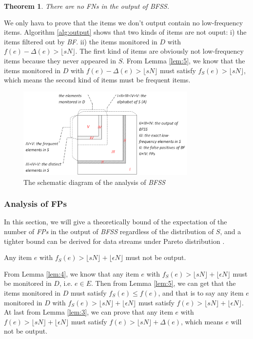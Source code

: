 \documentclass[conference]{IEEEtran}
\begin{document}
\newtheorem{theorem}{Theorem}
\begin{theorem}\label{thm:1}
	There are no \emph{FNs} in the output of \emph{BFSS}.
\end{theorem}

\begin{IEEEproof}
We only hava to prove that the items we don't output contain no low-frequency items. Algorithm \ref{alg:output} shows that two kinds of items are not ouput: i) the items filtered out by \emph{BF}. ii) the items monitored in $D$ with $f(e)-\Delta(e)>\lfloor sN\rfloor$. The first kind of items are obviously not low-frequency items because they never appeared in $S$. From Lemma \ref{lem:5}, we know that the items monitored in $D$ with $f(e)-\Delta(e)>\lfloor sN\rfloor$ must satisfy $f_S(e)>\lfloor sN\rfloor$, which means the second kind of items must be frequent items.
\end{IEEEproof}

\begin{figure}
	\centering
	\includegraphics[width=3.5in]{png/bfss.png}
	\caption{The schematic diagram of the analysis of \emph{BFSS}}
	\label{fig:bfss}
\end{figure}

\subsubsection{\textbf{Analysis of FPs}}
In this section, we will give a theoretically bound of the expectation of the number of \emph{FPs} in the output of \emph{BFSS} regardless of the distribution of $S$, and a tighter bound can be derived for data streams under Pareto distribution \cite{IEEEexample:pareto}.

\begin{lemma}\label{lem:6}
Any item $e$ with $f_S(e)>\lfloor sN\rfloor+\lfloor\epsilon N\rfloor$ must not be output.
\end{lemma}

\begin{IEEEproof}
From Lemma \ref{lem:4}, we know that any item $e$ with $f_S(e)>\lfloor sN\rfloor+\lfloor\epsilon N\rfloor$ must be monitored in $D$, i.e. $e\in E$. Then from Lemma \ref{lem:5}, we can get that the items monitored in $D$ must satisfy $f_S(e)\leq f(e)$, and that is to say any item $e$ monitored in $D$ with $f_S(e)>\lfloor sN\rfloor+\lfloor\epsilon N\rfloor$ must satisfy $f(e)>\lfloor sN\rfloor+\lfloor\epsilon N\rfloor$. At last from Lemma \ref{lem:3}, we can prove that any item $e$ with $f(e)>\lfloor sN\rfloor+\lfloor\epsilon N\rfloor$ must satisfy $f(e)>\lfloor sN\rfloor+\Delta(e)$, which means $e$ will not be output.
\end{IEEEproof}
\end{document}

